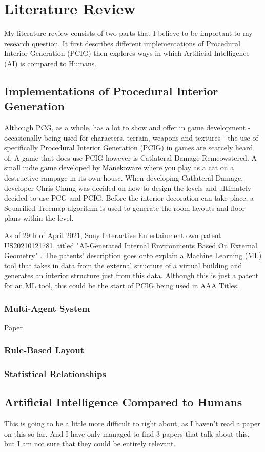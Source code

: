 \section{Literature Review}
My literature review consists of two parts that I believe to be important to my research question.
It first describes different implementations of Procedural Interior Generation (PCIG) then explores
ways in which Artificial Intelligence (AI) is compared to Humans.

\subsection{Implementations of Procedural Interior Generation}
Although PCG, as a whole, has a lot to show and offer in game development - occasionally being used for
characters, terrain, weapons and textures - the use of specifically Procedural Interior Generation 
(PCIG) in games are scarcely heard  of.
A game that does use PCIG however is Catlateral Damage Remeowstered\cite{game:catlateral}.
A small indie game developed by Manekoware where you play as a cat on a destructive rampage in its own house.
When developing Catlateral Damage, developer Chris Chung was decided on how to design the levels and ultimately decided to use PCG and PCIG\cite{pcg_in_gd}.
Before the interior decoration can take place, a Squarified Treemap algorithm is used to generate the room layouts and floor plans within the level.

\bigskip
As of 29th of April 2021, Sony Interactive Entertainment own patent US20210121781, 
titled "AI-Generated Internal Environments Based On External Geometry" \cite{sony-patent}.
The patents' description goes onto explain a 
Machine Learning (ML) tool that takes in data from the external structure of a virtual building
and generates an interior structure just from this data.
Although this is just a patent for an ML tool, this could be the start of PCIG being used in AAA Titles. 

\subsubsection*{Multi-Agent System}
Paper \cite{real-time-walkthroughs}
\subsubsection*{Rule-Based Layout}

\subsubsection*{Statistical Relationships}


\subsection{Artificial Intelligence Compared to Humans}
This is going to be a little more difficult to right about, as I haven't read a paper on this so far.
And I have only managed to find 3 papers that talk about this, but I am not sure that they could be entirely relevant.